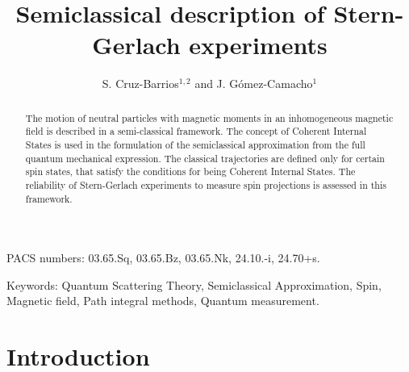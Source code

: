 \tightenlines
\def\grad{\vec\nabla}
\newcommand{\be}{\begin{equation}}
\newcommand{\ee}{\end{equation}}
\newcommand{\ba}{\begin{eqnarray}}
\newcommand{\ea}{\end{eqnarray}}

\title{Semiclassical description of Stern-Gerlach experiments}
\author{S. Cruz-Barrios$^{1,2}$ and J. G\'omez-Camacho$^1$}
\address{$^1$ Departamento de F\'\i sica At\'omica, Molecular y Nuclear, 
Aptdo. 1065, 41080 Sevilla, Spain}
\address{$^2$ Departamento de F\'\i sica Aplicada 1, E.U.I.T.A. 
Carretera de Utrera, Km.1 Sevilla, Spain } 
\maketitle
\begin{abstract}
The motion of neutral particles with magnetic moments in an inhomogeneous 
magnetic field is described in a semi-classical framework.
The concept of Coherent Internal States is used in the formulation of the
semiclassical approximation from the full quantum mechanical expression.
The classical trajectories are defined only for certain spin states, that 
satisfy the conditions for being Coherent Internal States.
The reliability  of Stern-Gerlach 
experiments to measure spin projections is assessed
in this framework.
\end{abstract}
\bigskip
\noindent
PACS numbers: 03.65.Sq, 03.65.Bz, 03.65.Nk, 24.10.-i, 24.70+s.

\bigskip
\noindent
Keywords: Quantum Scattering Theory, Semiclassical Approximation, 
Spin, Magnetic field, Path integral methods, Quantum measurement. 
\newpage
\section{Introduction}

